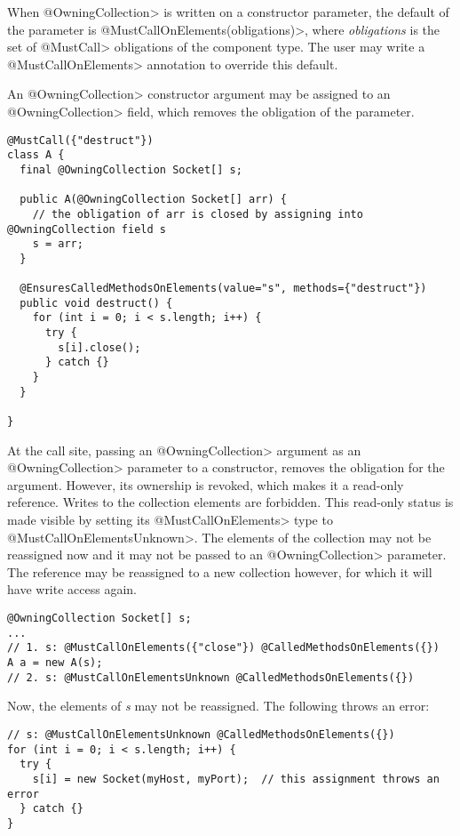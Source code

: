 When \<@OwningCollection> is written on a constructor parameter, the
default of the parameter is \<@MustCallOnElements(obligations)>, where
\textit{obligations} is the set of \<@MustCall> obligations of the
component type. The user may write a \<@MustCallOnElements> annotation to override this default.

An \<@OwningCollection> constructor argument may be assigned to an \<@OwningCollection> field, which removes the obligation of the parameter.

\begin{verbatim}
@MustCall({"destruct"})
class A {
  final @OwningCollection Socket[] s;

  public A(@OwningCollection Socket[] arr) {
    // the obligation of arr is closed by assigning into @OwningCollection field s
    s = arr;
  }

  @EnsuresCalledMethodsOnElements(value="s", methods={"destruct"})
  public void destruct() {
    for (int i = 0; i < s.length; i++) {
      try {
        s[i].close();
      } catch {}
    }
  }

}
\end{verbatim}

At the call site, passing an \<@OwningCollection> argument as an
\<@OwningCollection> parameter to a constructor, removes the obligation for
the argument. However, its ownership is revoked, which makes it a read-only
reference. Writes to the collection elements are forbidden. This read-only
status is made visible by setting its \<@MustCallOnElements> type to
\<@MustCallOnElementsUnknown>. The elements of the collection may not be
reassigned now and it may not be passed to an \<@OwningCollection>
parameter. The reference may be reassigned to a new collection however, for
which it will have write access again.

\begin{verbatim}
@OwningCollection Socket[] s;
...
// 1. s: @MustCallOnElements({"close"}) @CalledMethodsOnElements({})
A a = new A(s);
// 2. s: @MustCallOnElementsUnknown @CalledMethodsOnElements({})
\end{verbatim}

Now, the elements of \textit{s} may not be reassigned. The following throws an error:

\begin{verbatim}
// s: @MustCallOnElementsUnknown @CalledMethodsOnElements({})
for (int i = 0; i < s.length; i++) {
  try {
    s[i] = new Socket(myHost, myPort);  // this assignment throws an error
  } catch {}
}
\end{verbatim}

